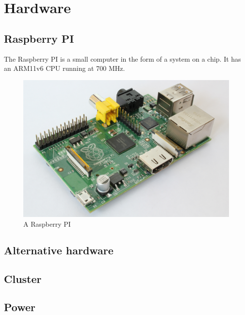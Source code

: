 \section{Hardware}
\subsection{Raspberry PI}
The Raspberry PI is a small computer in the form of a system on a chip. It has an ARM11v6 CPU running at 700 MHz.
\begin{figure}[h]
    \includegraphics{hardware/RaspberryPi}
    \caption{A Raspberry PI}
    \label{fig:raspberrypi_hw}
\end{figure}

\subsection{Alternative hardware}
\subsection{Cluster}
\subsection{Power}
